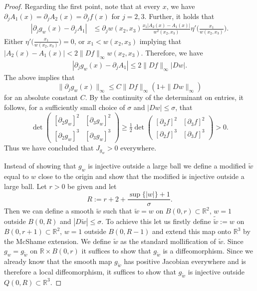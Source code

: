 \documentclass[12pt,a4paper]{amsart}
\theoremstyle{plain}
\theoremstyle{definition}
\numberwithin{equation}{section}
\def\er{\mathbb R}
\begin{document}
\begin{proof}
		
		Regarding the first point, note that at every $x$, we have $\partial_j A_1(x) = \partial_j A_2(x) = \partial_j f(x)$ for $ j = 2, 3$. Further, it holds that
		$$
			\begin{aligned}
				|\partial_jg_w(x) - \partial_jA_1| &\leq \partial_jw(x_2,x_3) \frac{x_1|A_2(x) - A_1(x)|}{w^2(x_2,x_3)}\eta'\Big(\frac{x_1}{w(x_2,x_3)}\Big).
			\end{aligned}
			$$
		Either $\eta'\Big(\frac{x_1}{w(x_2,x_3)}\Big) = 0$, or $x_1<w(x_2,x_3)$ implying that $|A_2(x) - A_1(x)|< 2\|Df\|_{\infty}w(x_2,x_3)$. Therefore, we have
		\begin{equation}\label{EstimateDJ}
				\begin{aligned}
				|\partial_jg_w(x) - \partial_jA_1|\leq 2\|Df\|_{\infty}|Dw|.
			\end{aligned}
		\end{equation}
		The above implies that
		\begin{equation}\label{TruEstimateDJ}
				\|\partial_jg_w(x)\|_{\infty}\leq C\|Df\|_{\infty}(1+\|Dw\|_{\infty})
		\end{equation}
		for an absolute constant $C$. By the continuity of the determinant on entries, it follows, for a sufficiently small choice of $\sigma$ and $|Dw|\leq \sigma$, that 
		\begin{equation}\label{Poker}
			\det \left( \begin{matrix}
			[\partial_2g_w]^2 & [\partial_3g_w]^2\\
			[\partial_2g_w]^3 & [\partial_3g_w]^3
		\end{matrix}\right) \geq \tfrac{1}{2}\det \left( \begin{matrix}
		[\partial_2f]^2 & [\partial_3f]^2\\
		[\partial_2f]^3 & [\partial_3f]^3
		\end{matrix}\right)>0.
		\end{equation}
		Thus we have concluded that $J_{g_w}>0$ everywhere.
		
		Instead of showing that $g_{w}$ is injective outside a large ball we define a modified $\tilde{w}$ equal to $w$ close to the origin  and show that the modified is injective outside a large ball. Let $r>0$ be given and let
		$$
			R:=r+2+\frac{\sup\{|w|\}+1}{\sigma}.
		$$
		Then we can define a smooth $\tilde{w}$ such that $\tilde{w} = w$ on $B(0,r)\subset \er^2$, $w= 1$ outside $B(0,R)$ and $|D\tilde{w}|\leq \sigma$. To achieve this let us firstly define $\tilde{\tilde{w}} := w$ on $B(0,r+1)\subset \er^2$, $w= 1$ outside $B(0,R-1)$ and extend this map onto $\er^3$ by the McShame extension. We define $\tilde{w}$ as the standard mollification of $\tilde{w}$. Since $g_w = g_{\tilde{w}}$ on $\er\times B(0,r)$ it suffices to show that $g_{\tilde{w}}$ is a diffeomorphism. Since we already know that the smooth map $g_{\tilde{w}}$ has positive Jacobian everywhere and is therefore a local diffeomorphism, it suffices to show that $g_{\tilde{w}}$ is injective outside $Q(0,R)\subset \er^3$.
		

\end{proof}
\end{document}
